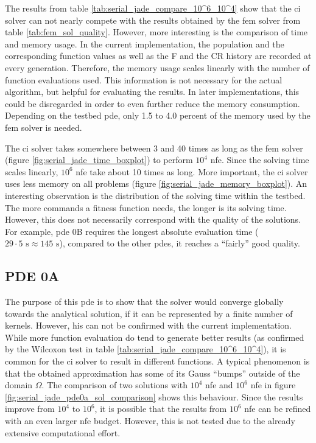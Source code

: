 \documentclass[./\jobname.tex]{subfiles}
\begin{document}
The results from table \ref{tab:serial_jade_compare_10^6_10^4} show that the \gls{ci} solver can not nearly compete with the results obtained by the \gls{fem} solver from table \ref{tab:fem_sol_quality}. 
However, more interesting is the comparison of time and memory usage. 
In the current implementation, the population and the corresponding function values as well as the F and the CR history are recorded at every generation. Therefore, the memory usage scales linearly with the number of function evaluations used. This information is not necessary for the actual algorithm, but helpful for evaluating the results. In later implementations, this could be disregarded in order to even further reduce the memory consumption. Depending on the testbed \gls{pde}, only 1.5 to 4.0 percent of the memory used by the \gls{fem} solver is needed.

The \gls{ci} solver takes somewhere between 3 and 40 times as long as the \gls{fem} solver (figure \ref{fig:serial_jade_time_boxplot}) to perform $10^4$ \gls{nfe}. Since the solving time scales linearly, $10^6$ \gls{nfe} take about 10 times as long. More important, the \gls{ci} solver uses less memory on all problems (figure \ref{fig:serial_jade_memory_boxplot}). An interesting observation is the distribution of the solving time within the testbed. The more commands a fitness function needs, the longer is its solving time. However, this does not necessarily correspond with the quality of the solutions. For example, \gls{pde} 0B requires the longest absolute evaluation time ($29 \cdot 5 \text{ s} \approx 145\text{ s}$), compared to the other \gls{pde}s, it reaches a ``fairly'' good quality. 



\subsection{PDE 0A}
\label{chap: experiment_0_pde_0A}

The purpose of this \gls{pde} is to show that the solver would converge globally towards the analytical solution, if it can be represented by a finite number of kernels. However, his can not be confirmed with the current implementation. While more function evaluation do tend to generate better results (as confirmed by the Wilcoxon test in table \ref{tab:serial_jade_compare_10^6_10^4}), it is common for the \gls{ci} solver to result in different functions. A typical phenomenon is that the obtained approximation has some of its Gauss ``bumps'' outside of the domain $\Omega$. The comparison of two solutions with $10^4$ \gls{nfe} and $10^6$ \gls{nfe} in figure \ref{fig:serial_jade_pde0a_sol_comparison} shows this behaviour. Since the results improve from $10^4$ to $10^6$, it is possible that the results from $10^6$ \gls{nfe} can be refined with an even larger \gls{nfe} budget. However, this is not tested due to the already extensive computational effort. 
\end{document}
